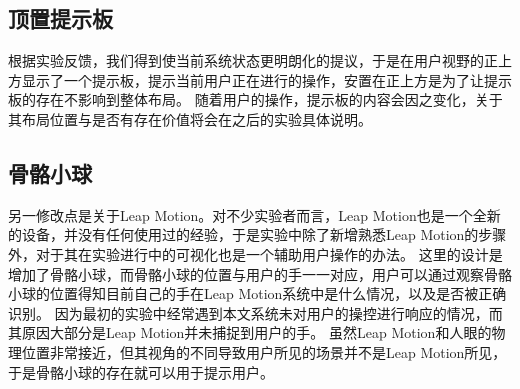 \subsection{顶置提示板}
\label{fig:interaction:board}
根据实验反馈，我们得到使当前系统状态更明朗化的提议，于是在用户视野的正上方显示了一个提示板，提示当前用户正在进行的操作，安置在正上方是为了让提示板的存在不影响到整体布局。
随着用户的操作，提示板的内容会因之变化，关于其布局位置与是否有存在价值将会在之后的实验具体说明。

\subsection{骨骼小球}
\label{sec:interaction:skeleton}

另一修改点是关于Leap Motion。对不少实验者而言，Leap Motion也是一个全新的设备，并没有任何使用过的经验，于是实验中除了新增熟悉Leap Motion的步骤外，对于其在实验进行中的可视化也是一个辅助用户操作的办法。
这里的设计是增加了骨骼小球，而骨骼小球的位置与用户的手一一对应，用户可以通过观察骨骼小球的位置得知目前自己的手在Leap Motion系统中是什么情况，以及是否被正确识别。
因为最初的实验中经常遇到本文系统未对用户的操控进行响应的情况，而其原因大部分是Leap Motion并未捕捉到用户的手。
虽然Leap Motion和人眼的物理位置非常接近，但其视角的不同导致用户所见的场景并不是Leap Motion所见，于是骨骼小球的存在就可以用于提示用户。

\begin{figure}[!htp]
	\centering
	\subfigure{\label{fig:skeletonball:a}}\addtocounter{subfigure}{-2}
	\subfigure{\label{fig:skeletonball:b}}\addtocounter{subfigure}{-2}
	\vspace{-1em}
\end{figure}

